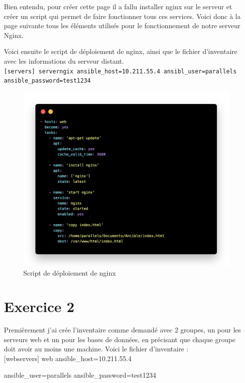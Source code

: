 \documentclass[12pt, a4paper]{article}
\begin{document}
Bien entendu, pour créer cette page il a fallu installer nginx sur le serveur 
et créer un script qui permet de faire fonctionner tous ces services. Voici
donc à la page suivante tous les éléments utilisés pour le fonctionnement 
de notre serveur Nginx. 

\newpage
Voici ensuite le script de déploiement de nginx, ainsi que le fichier d'inventaire
avec les informations du serveur distant. \\

\texttt{[servers]
serverngix ansible\_host=10.211.55.4 ansibl\_user=parallels ansible\_password=test1234}
\begin{figure}[h]
    \centering
    \includegraphics[width=1\textwidth]{img/deplou.png}
    \caption{Script de déploiement de nginx}
    \label{fig:1}
\end{figure}

\newpage
\section{Exercice 2}
Premièrement j'ai crée l'inventaire comme demandé avec 2 groupes, un pour les 
serveurs web et un pour les bases de données, en précisant que chaque 
groupe doit avoir au moins une machine. Voici le fichier d'inventaire :\\

[webservers]
web ansible\_host=10.211.55.4 

ansible\_user=parallels ansible\_password=test1234\\
\end{document}
